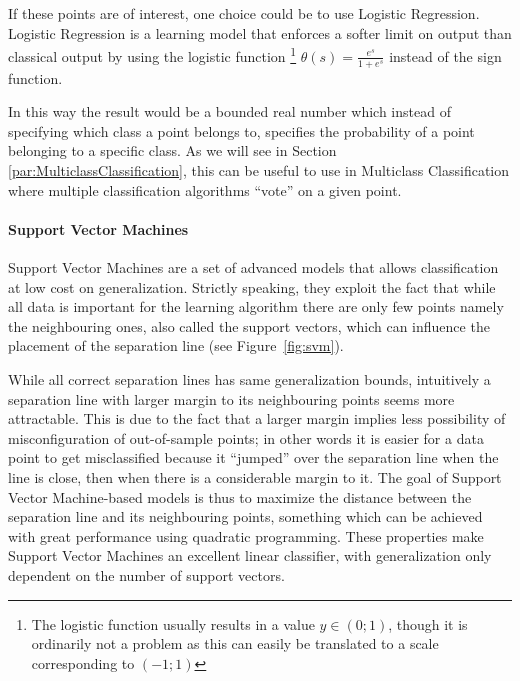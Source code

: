 If these points are of interest, one choice could be to use Logistic Regression.
Logistic Regression is a learning model that enforces a softer limit on output than classical output by using the logistic function
\footnote{The logistic function usually results in a value $y \in \left(0;1\right)$, though it is ordinarily not a problem as
this can easily be translated to a scale corresponding to $\left(-1;1\right)$}
$\theta(s) = \frac{e^s}{1+e^s}$ instead of the sign function.

In this way the result would be a bounded real number which instead of specifying which class a point belongs to, specifies the probability of a point belonging to a specific class.
As we will see in Section \ref{par:MulticlassClassification}, this can be useful to use in Multiclass Classification where multiple classification algorithms ``vote'' on a given point.
\paragraph{Support Vector Machines}
\label{par:SupportVectorMachines}

Support Vector Machines are a set of advanced models that allows classification at low cost on generalization.
Strictly speaking, they exploit the fact that while all data is important for the learning algorithm there 
are only few points namely the neighbouring ones, also called the support vectors, which can influence the placement of the separation line (see Figure~\ref{fig:svm}).

\begin{minipage}{\linewidth}
\centering
{}
\label{fig:svm}
\end{minipage}

While all correct separation lines has same generalization bounds, intuitively a separation line with larger margin to its neighbouring points seems more attractable.
This is due to the fact that a larger margin implies less possibility of misconfiguration of out-of-sample points; in other words it is easier for a data point to get
misclassified because it ``jumped'' over the separation line when the line is close, then when there is a considerable margin to it.
The goal of Support Vector Machine-based models is thus to maximize the distance between the separation line and its neighbouring points,
something which can be achieved with great performance using quadratic programming\cite{learningfromdata2012course}\cite{frank2006algorithm}. 
These properties make Support Vector Machines an excellent linear classifier, with generalization only dependent on the number of support vectors.

